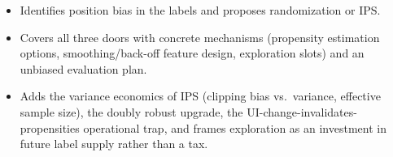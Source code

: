 \begin{interviewq}

\goodgreat
\begin{itemize}
    \item {} Identifies position bias in the labels and proposes randomization or IPS.
    \item {} Covers all three doors with concrete mechanisms (propensity estimation options, smoothing/back-off feature design, exploration slots) and an unbiased evaluation plan.
    \item {} Adds the variance economics of IPS (clipping bias vs.\ variance, effective sample size), the doubly robust upgrade, the UI-change-invalidates-propensities operational trap, and frames exploration as an investment in future label supply rather than a tax.
\end{itemize}

\end{interviewq}

